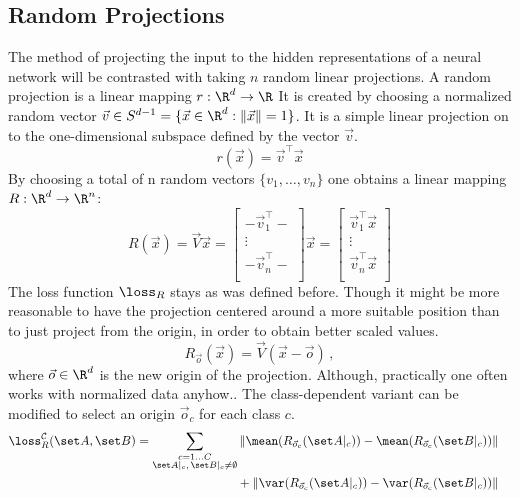 \subsection{Random Projections}
The method of projecting the input to the hidden representations of a neural network will be contrasted with taking $n$ random linear projections.
A random projection is a linear mapping $r: \R^d \to \R$
It is created by choosing a normalized random vector $\vec v \in S^{d-1} = \{\vec x \in \R^d : \|\vec x\| = 1\}$.
It is a simple linear projection on to the one-dimensional subspace defined by the vector $\vec v$.
\[
    r(\vec x) = \vec v ^\top \vec x
\]
By choosing a total of n random vectors $\{v_1, \dots, v_n\}$ one obtains a linear mapping $R: \R^d \to \R^n$:
\[
    R(\vec x) = \vec V \vec x =
    \begin{bmatrix}
        - \vec v_1 ^\top - \\
        \vdots \\
        - \vec v_n ^\top - \\
    \end{bmatrix}
    \vec x =
    \begin{bmatrix}
        \vec v_1 ^\top \vec x \\
        \vdots \\
        \vec v_n ^\top \vec x \\
    \end{bmatrix}
\]
%
The loss function $\loss_R$ stays as was defined before.
Though it might be more reasonable to have the projection centered around a more suitable position than to just project from the origin, in order to obtain better scaled values.
% 
\[
    R_{\vec o} (\vec x) = \vec V (\vec x - \vec o) \,,
\]
where $\vec o \in \R^d$ is the new origin of the projection. Although, practically one often works with normalized data anyhow..
The class-dependent variant can be modified to select an origin $\vec o_c$ for each class $c$.
% 
\begin{align*}
    \loss _R ^{\mathcal C} (\set A, \set B) &=
    \begin{aligned}[t]
        \sum _{\substack{c = 1 \dots C \\ \set A|_c ,\, \set B|_c \neq \emptyset}} 
        \|\mean ({R_{\vec o_c} (\set A|_c)}) - \mean ({R_{\vec o_c} (\set B|_c)}) \| \\
        {} + \|\var ({R_{\vec o_c} (\set A|_c)}) - \var ({R_{\vec o_c} (\set B|_c)}) \| 
    \end{aligned}
\end{align*}

